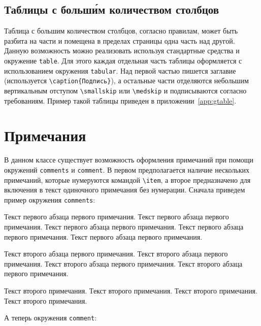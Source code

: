 \subsection{Таблицы с больш\'{и}м количеством столбцов}
\label{sec:gtable}

Таблица с большим количеством столбцов, согласно правилам, может быть разбита на
части  и помещена в пределах страницы одна часть над другой. Данную возможность
можно реализовать используя стандартные средства \LaTeXe{}  и окружение
\verb|table|. Для этого каждая отдельная часть таблицы оформляется с
использованием окружения \verb|tabular|. Над первой частью пишется заглавие
(используется \verb|\caption{Подпись}|), а остальные части отделяются небольшим
вертикальным отступом \verb|\smallskip| или \verb|\medskip| и подписываются
согласно требованиям. Пример такой таблицы приведен в
приложении~\ref{app:gtable}.

\section{Примечания}

В данном классе существует возможность оформления примечаний при помощи
окружений \verb|comments| и \verb|comment|. В первом предполагается наличие
нескольких примечаний, которые нумеруются командой \verb|\item|, а второе
предназначено для включения в текст одиночного примечания без нумерации. Сначала
приведем пример окружения \verb|comments|:

\begin{comments}
\item Текст первого абзаца первого примечания. Текст первого абзаца первого
примечания. Текст первого абзаца первого примечания. Текст первого абзаца
первого примечания. Текст первого абзаца первого примечания.

Текст второго абзаца первого примечания. Текст второго абзаца первого
примечания. Текст второго абзаца первого примечания. Текст второго абзаца
первого примечания.

\item Текст второго примечания. Текст второго примечания. Текст второго
примечания. Текст второго примечания.
\end{comments}

А теперь окружения \verb|comment|:
\begin{comment}
Текст примечания. Текст примечания. Текст примечания. Текст примечания. Текст
примечания. Текст примечания. Текст примечания. Текст примечания. Текст
примечания. Текст примечания. Текст примечания. Текст примечания.

Текст примечания. Текст примечания. Текст примечания. Текст примечания. Текст
примечания. Текст примечания. Текст примечания. Текст примечания. Текст
примечания. Текст примечания. Текст примечания. Текст примечания. Текст
примечания. Текст примечания. Текст примечания.
\end{comment}

